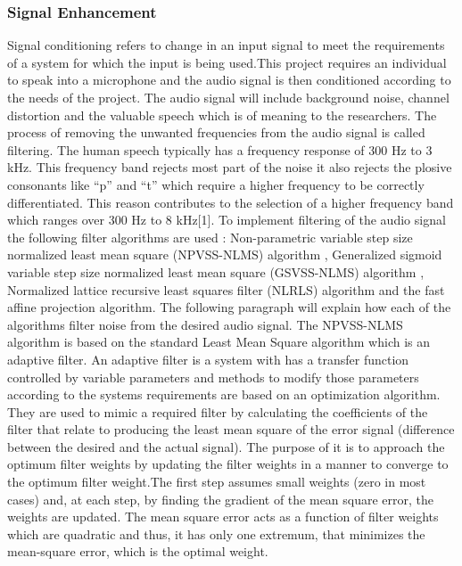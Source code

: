 \documentclass[10pt,twocolumn]{witseiepaper}
\begin{document}
\subsubsection{Signal Enhancement}
Signal conditioning refers to change in an input signal to meet the requirements of a system for which the input is being used.This project requires an individual to speak into a microphone and the audio signal is then conditioned according to the needs of the project. The audio signal will include background noise, channel distortion and the valuable speech which is of meaning to the researchers.  
The process of removing the unwanted frequencies from the audio signal is called filtering.
The human speech typically has a frequency response of 300 Hz to 3 kHz. This frequency band rejects most part of the noise it also rejects the plosive consonants like “p” and “t” which require a higher frequency to be correctly differentiated. This reason contributes to the selection of a higher frequency band which ranges over 300 Hz to 8 kHz[1]. To implement filtering of the audio signal the following filter algorithms are used : Non-parametric variable step size normalized least mean square (NPVSS-NLMS) algorithm , Generalized sigmoid variable step size normalized least mean square (GSVSS-NLMS) algorithm , Normalized lattice recursive least squares filter (NLRLS) algorithm and the fast affine projection algorithm. The following paragraph will explain how each of the algorithms filter noise from the desired audio signal.
The NPVSS-NLMS algorithm is based on the standard Least Mean Square algorithm which is an adaptive filter. An adaptive filter is a system with has a transfer function controlled by variable parameters and methods to modify those parameters according to the systems requirements are based on an optimization algorithm. They are used to mimic a required filter by calculating the coefficients of the filter that relate to producing the least mean square of the error signal (difference between the desired and the actual signal). The purpose of it is to approach the optimum filter weights by updating the filter weights in a manner to converge to the optimum filter weight.The first step assumes small weights (zero in most cases) and, at each step, by finding the gradient of the mean square error, the weights are updated. The mean square error acts as a function of filter weights which are quadratic and thus, it has only one extremum, that minimizes the mean-square error, which is the optimal weight. 
\end{document}
